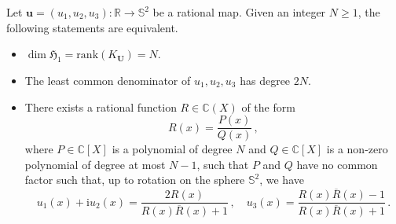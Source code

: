 \documentclass[10pt,a4paper]{amsart}
\newcommand{\C}{\mathbb{C}}
\newcommand{\Hfr}{\mathfrak{H}}
\newcommand{\R}{\mathbb{R}}
\newcommand{\Ss}{\mathbb{S}}
\newcommand{\Ub}{\mathbf{U}}
\newcommand{\ii}{\mathrm{i}}
\newcommand{\ov}{\overline}
\newcommand{\rank}{\mathrm{rank}}
\newcommand{\uu}{\mathbf{u}}
\renewcommand{\geq}{\geqslant}
\begin{document}
\begin{thm} \label{thm:toeplitz_stereo_app}
Let $\uu =(u_1, u_2, u_3) : \R \to \Ss^2$ be a rational map. Given an integer $N \geq 1$, the following statements are equivalent.
\begin{itemize}
\item[(i)] $\dim \Hfr_1 = \rank(K_{\Ub}) = N$.
\item[(ii)] The least common denominator of $u_1, u_2, u_3$ has degree $2N$.
\item[(iii)] There exists a rational function $R \in \C(X)$ of the form
$$
R(x) = \frac{P(x)}{Q(x)} \, ,
$$
where $P \in \C[X]$ is a polynomial of degree $N$ and $Q \in \C[X]$ is a non-zero polynomial of degree at most $N-1$, such that $P$ and $Q$ have no common factor such that, up to rotation on the sphere $\Ss^2$, we have
$$
u_1(x) + \ii u_2(x) = \frac{2 R(x)}{R(x) \ov{R}(x)+1} \, , \quad u_3(x) = \frac{R(x) \ov{R}(x) -1}{R(x) \ov{R}(x) + 1} \, .
$$
\end{itemize}
\end{thm}  
\end{document}
